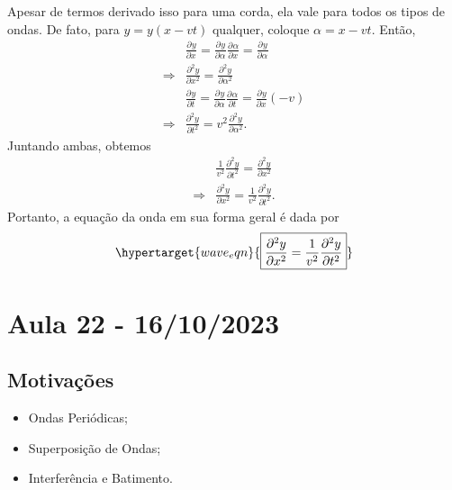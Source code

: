 \documentclass{article}
\begin{document}
  Apesar de termos derivado isso para uma corda, ela vale para todos os tipos de ondas. De fato, para
 \(y = y(x-vt)\) qualquer, coloque \(\alpha  = x - vt\). Então, 
\begin{align*}
  &\frac{\partial^{}y}{\partial x^{}} = \frac{\partial^{}y}{\partial \alpha ^{}}\frac{\partial^{}\alpha }{\partial x^{}} = \frac{\partial^{}y}{\partial \alpha ^{}}\\
  \Rightarrow & \frac{\partial^{2}y}{\partial x^{2}} = \frac{\partial^{2}y}{\partial \alpha ^{2}}\\
              & \frac{\partial^{}y}{\partial t^{}}=\frac{\partial^{}y}{\partial \alpha ^{}}\frac{\partial^{}\alpha }{\partial t^{}}=\frac{\partial^{}y}{\partial x^{}}(-v)\\
  \Rightarrow & \frac{\partial^{2}y}{\partial t^{2}}=v^{2}\frac{\partial^{2}y}{\partial \alpha ^{2}}.
\end{align*}
Juntando ambas, obtemos 
 \begin{align*}
   &\frac{1}{v^{2}}\frac{\partial^{2}y}{\partial t^{2}}=\frac{\partial^{2}y}{\partial x^{2}}\\
   \Rightarrow & \frac{\partial^{2}y}{\partial x^{2}}=\frac{1}{v^{2}}\frac{\partial^{2}y}{\partial t^{2}}.
 \end{align*}
Portanto, a equação da onda em sua forma geral é dada por 
  \[
    \hypertarget{wave_eqn}{\boxed{\frac{\partial^{2}y}{\partial x^{2}}=\frac{1}{v^{2}}\frac{\partial^{2}y}{\partial t^{2}}}}
  \]
\newpage

\section{Aula 22 - 16/10/2023}
\subsection{Motivações}
\begin{itemize}
  \item Ondas Periódicas;
  \item Superposição de Ondas;
  \item Interferência e Batimento.
\end{itemize}
\end{document}
